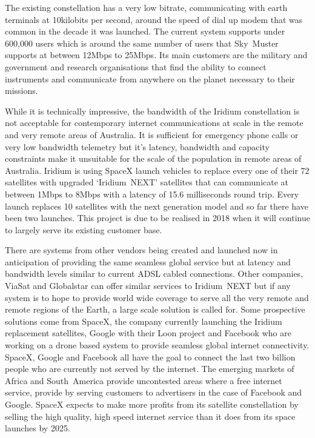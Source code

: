The existing constellation has a very low bitrate, communicating with earth terminals at 10kilobits per second, around the speed of dial up modem that was common in the decade it was launched. The current system supports under 600,000 users which is around the same number of users that Sky~Muster supports at between 12Mbps to 25Mbps. Its main customers are the military and government and research organisations that find the ability to connect instruments and communicate from anywhere on the planet necessary to their missions.

While it is technically impressive, the bandwidth of the Iridium constellation is not acceptable for contemporary internet communications at scale in the remote and very remote areas of Australia. It is sufficient for emergency phone calls or very low bandwidth telemetry but it's latency, bandwidth and capacity constraints make it unsuitable for the scale of the population in remote areas of Australia. Iridium is using SpaceX launch vehicles to replace every one of their 72 satellites with upgraded `Iridium~NEXT' satellites that can communicate at between 1Mbps to 8Mbps with a latency of 15.6 milliseconds round trip. Every launch replaces 10 satellites with the next generation model and so far there have been two launches. This project is due to be realised in 2018 when it will continue to largely serve its existing customer base\cite{RefWorks:343}. 

There are systems from other vendors being created and launched now in anticipation of providing the same seamless global service but at latency and bandwidth levels similar to current ADSL cabled connections. Other companies, ViaSat and Globalstar can offer similar services to Iridium~NEXT but if any system is to hope to provide world wide coverage to serve all the very remote and remote regions of the Earth, a large scale solution is called for. Some prospective solutions come from SpaceX, the company currently launching the Iridium replacement satellites, Google with their Loon project and Facebook who are working on a drone based system to provide seamless global internet connectivity.  SpaceX, Google and Facebook all have the goal to connect the last two billion people who are currently not served by the internet. The emerging markets of Africa and South~America provide uncontested areas where a free internet service, provide by serving customers to advertisers in the case of Facebook and Google. SpaceX expects to make more profits from its satellite constellation by selling the high quality, high speed internet service than it does from its space launches by 2025. 

